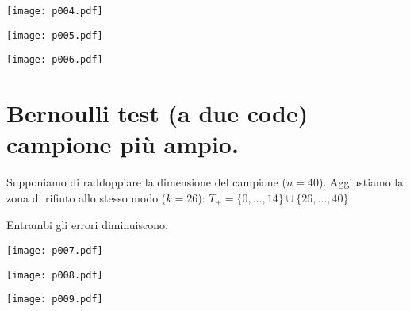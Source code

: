 \documentclass[10pt,openany]{book}
\theoremstyle{mio}
\theoremstyle{liscio}
\begin{document}
\hfil\texttt{[image: p004.pdf]}

\hfil\texttt{[image: p005.pdf]}

\hfil\texttt{[image: p006.pdf]}





\clearpage\section{Bernoulli test (a due code) campione più ampio.}

Supponiamo di raddoppiare la dimensione del campione ($n=40$). Aggiustiamo la zona di rifiuto allo stesso modo ($k=26$):  $T_+=\{0,\dots,14\}\cup \{26,\dots,40\}$

Entrambi gli errori diminuiscono.


\hfil\texttt{[image: p007.pdf]}

\hfil\texttt{[image: p008.pdf]}

\hfil\texttt{[image: p009.pdf]}
\end{document}
